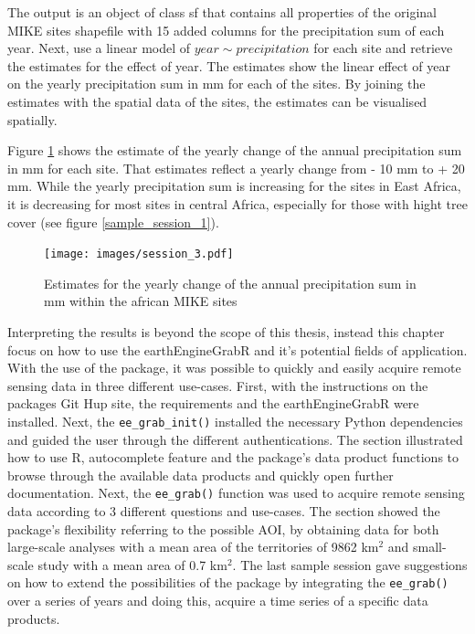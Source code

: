 The output is an object of class sf that contains all properties of the original MIKE sites shapefile with 15 added columns for the precipitation sum of each year.
Next, use a linear model of $year  \sim precipitation$ for each site and retrieve the estimates for the effect of year. 
The estimates show the linear effect of year on the yearly precipitation sum in mm for each of the sites. 
By joining the estimates with the spatial data of the sites, the estimates can be visualised spatially. 

Figure \ref{change} shows the estimate of the yearly change of the annual precipitation sum in mm for each site. That estimates reflect a yearly change from - 10 mm to + 20 mm. While the yearly precipitation sum is increasing for the sites in East Africa, it is decreasing for most sites in central Africa, especially for those with hight tree cover (see figure \ref*{sample_session_1}).

\begin{center}
	\begin{figure}[h]
		\begin{center}
			\texttt{[image: images/session\_3.pdf]}
			\caption{Estimates for the yearly change of the annual precipitation sum in mm within the african MIKE sites}
			\label{change}
		\end{center}
	\end{figure}
\end{center}



Interpreting the results is beyond the scope of this thesis, instead this chapter focus on how to use the earthEngineGrabR and it's potential fields of application.
With the use of the package, it was possible to quickly and easily acquire remote sensing data in three different use-cases. First, with the instructions on the packages Git Hup site, the requirements and the earthEngineGrabR were installed. Next, the \texttt{ee\_grab\_init()} installed the necessary Python dependencies and guided the user through the different authentications. The section illustrated how to use R, autocomplete feature and the package's data product functions to browse through the available data products and quickly open further documentation. Next, the \texttt{ee\_grab()} function was used to acquire remote sensing data according to 3 different questions and use-cases. The section showed the package's flexibility referring to the possible AOI, by obtaining data for both large-scale analyses with a mean area of the territories of 9862 km$^2$ and small-scale study with a mean area of 0.7 km$^2$.
The last sample session gave suggestions on how to extend the possibilities of the package by integrating the \texttt{ee\_grab()} over a series of years and doing this, acquire a time series of a specific data products.





